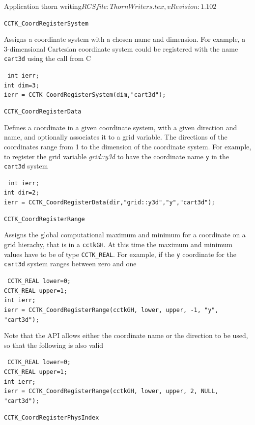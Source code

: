 \begin{cactuspart}{2}{Application thorn writing}{$RCSfile: ThornWriters.tex,v $}{$Revision: 1.102 $}
\begin{Lentry}
\item[{\tt CCTK\_CoordRegisterSystem}]

Assigns a coordinate system with a chosen name and dimension. For example,
a 3-dimensional Cartesian coordinate system could be registered with the
name {\tt cart3d} using the call from C

{\tt
int ierr;\\
int dim=3;\\
ierr = CCTK\_CoordRegisterSystem(dim,"cart3d");
}

\item[{\tt CCTK\_CoordRegisterData}]

Defines a coordinate in a given coordinate system, with a given
	direction and name, and optionally associates it to a grid variable.
The directions of the coordinates range from 1 to the dimension of the
coordinate system. For example, to register the grid variable {\it grid::y3d}
to have the coordinate name {\tt y} in the {\tt cart3d} system

{\tt
int ierr;\\
int dir=2;\\
ierr = CCTK\_CoordRegisterData(dir,"grid::y3d","y","cart3d");
}

\item[{\tt CCTK\_CoordRegisterRange}]

Assigns the global computational maximum and minimum for a coordinate
on a grid hierachy, that is in a {\tt cctkGH}. At this time the
maximum and minimum values have to be of type {\tt CCTK\_REAL}. For
example, if the {\tt y} coordinate for the {\tt cart3d} system ranges
between zero and one

{\tt
CCTK\_REAL lower=0;\\
CCTK\_REAL upper=1;\\
int ierr;\\
ierr = CCTK\_CoordRegisterRange(cctkGH, lower, upper, -1, "y", "cart3d");
}

Note that the API allows either the coordinate name or the direction to
be used, so that the following is also valid

{\tt
CCTK\_REAL lower=0;\\
CCTK\_REAL upper=1;\\
int ierr;\\
ierr = CCTK\_CoordRegisterRange(cctkGH, lower, upper, 2, NULL, "cart3d");
}

\item[{\tt CCTK\_CoordRegisterPhysIndex}]


\end{Lentry}
\end{cactuspart}
